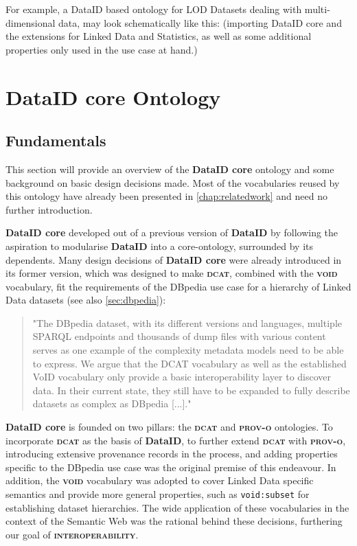 \documentclass[a4paper,english,twoside,BCOR1.5cm,headsepline,DIV12,appendixprefix,final,12pt]{scrbook}
\newcommand{\interoperability}{{\ttfamily\scshape\bfseries interoperability}\xspace}
\newcommand{\dataid}{{\ttfamily\bfseries DataID}\xspace}
\newcommand{\core}{{\ttfamily\bfseries DataID core}\xspace}
\newcommand{\prov}{{\scshape\bfseries prov-o}\xspace}
\newcommand{\void}{{\scshape\bfseries void}\xspace}
\newcommand{\dcat}{{\scshape\bfseries dcat}\xspace}
\newcommand{\prop}[1]{{{\texttt{#1}}}}
\begin{document}
For example, a DataID based ontology for LOD Datasets dealing with multi-dimensional data, may look schematically like this:
(importing DataID core and the extensions for Linked Data and Statistics, as well as some additional properties only used in the use case at hand.)

\chapter{DataID core Ontology}
\label{cahp:core}

\section{Fundamentals} 
\label{sec:coreintro}

This section will provide an overview of the \core ontology and some background on basic design decisions made. Most of the vocabularies reused by this ontology have already been presented in \cref{chap:relatedwork} and need no further introduction.

\core developed out of a previous version of \dataid by following the aspiration to modularise \dataid into a core-ontology, surrounded by its dependents. Many design decisions of \core were already introduced in its former version, which was designed to make \dcat, combined with the \void vocabulary, fit the requirements of the DBpedia use case for a hierarchy of Linked Data datasets (see also \cref{sec:dbpedia}):

\begin{quote}
"The DBpedia dataset, with
its different versions and languages, multiple SPARQL endpoints
and thousands of dump files with various content
serves as one example of the complexity metadata models
need to be able to express. We argue that the DCAT vocabulary
as well as the established VoID vocabulary only
provide a basic interoperability layer to discover data. In
their current state, they still have to be expanded to fully
describe datasets as complex as DBpedia [...]." \cite{dataID2014} 
\end{quote}

\core is founded on two pillars: the \dcat and \prov ontologies. To incorporate \dcat as the basis of \dataid, to further extend \dcat with \prov, introducing extensive provenance records in the process, and adding properties specific to the DBpedia use case was the original premise of this endeavour. In addition, the \void vocabulary was adopted to cover Linked Data specific semantics and provide more general properties, such as  \prop{void:subset} for establishing dataset hierarchies. The wide application of these vocabularies in the context of the Semantic Web was the rational behind these decisions, furthering our goal of \interoperability. 
\end{document}
